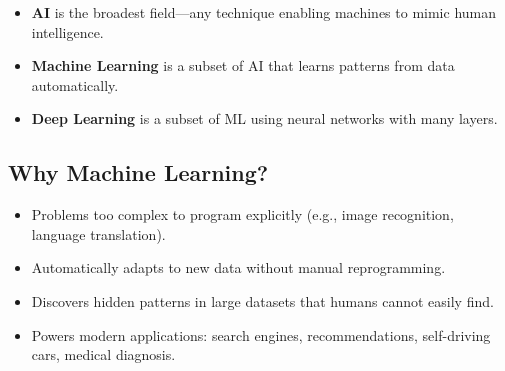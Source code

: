 \documentclass[11pt,a4paper]{article}
\begin{document}
\begin{center}
\end{center}
\smallskip
\begin{itemize}[leftmargin=1.5em, itemsep=3pt]
  \item \textbf{\textcolor{primary}{AI}} is the broadest field---any technique enabling machines to mimic human intelligence.
  \item \textbf{\textcolor{orange!70!black}{Machine Learning}} is a subset of AI that learns patterns from data automatically.
  \item \textbf{\textcolor{greenhl!70!black}{Deep Learning}} is a subset of ML using neural networks with many layers.
\end{itemize}

\subsection{Why Machine Learning?}
\begin{itemize}[leftmargin=*]
  \item Problems too complex to program explicitly (e.g., image recognition, language translation).
  \item Automatically adapts to new data without manual reprogramming.
  \item Discovers hidden patterns in large datasets that humans cannot easily find.
  \item Powers modern applications: search engines, recommendations, self-driving cars, medical diagnosis.
\end{itemize}
\end{document}
